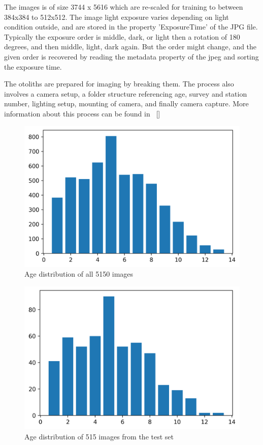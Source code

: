 \documentclass[10pt,letterpaper]{article}
\newcommand\Mycite[1]{%
  \citeauthor{#1}~[\citeyear{#1}]}
\begin{document}
The images is of size 3744 x 5616 which are re-scaled for training to between 384x384 to 512x512. The image light exposure varies depending on light condition outside, and are stored in the property 'ExposureTime' of the JPG file. Typically the exposure order is middle, dark, or light then a rotation of 180 degrees, and then middle, light, dark again. But the order might change, and
the given order is recovered by reading the metadata property of the jpeg and sorting the exposure time.

The otoliths are prepared for imaging by breaking them.
The process also involves a camera setup, a folder structure referencing 
age, survey and station number, lighting setup, mounting of camera, and 
finally camera capture. More information about this process
can be found in \Mycite{codOtolithsMyers}


\begin{figure}[h!]
  \centering
  \includegraphics[scale=0.60]{distribution/age_distribution.png}
  \caption{Age distribution of all 5150 images}
\end{figure}

\begin{figure}[h!]
  \centering
  \includegraphics[scale=0.60]{distribution/age_distribution_test.png}
  \caption{Age distribution of 515 images from the test set}
\end{figure}
\end{document}
